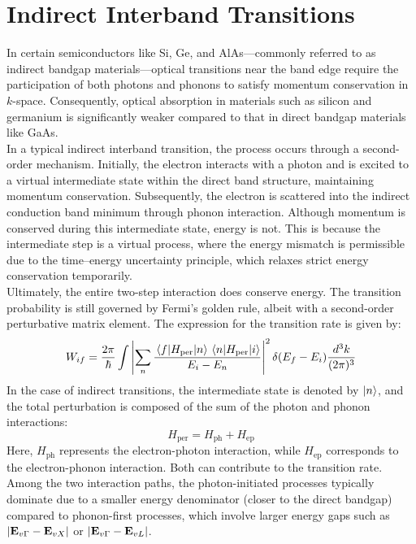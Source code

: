 \section{Indirect Interband Transitions}
In certain semiconductors like Si, Ge, and AlAs—commonly referred to as indirect bandgap materials—optical transitions near the band edge require the participation of both photons and phonons to satisfy momentum conservation in $k$-space. Consequently, optical absorption in materials such as silicon and germanium is significantly weaker compared to that in direct bandgap materials like GaAs.\\
In a typical indirect interband transition, the process occurs through a second-order mechanism. Initially, the electron interacts with a photon and is excited to a virtual intermediate state within the direct band structure, maintaining momentum conservation. Subsequently, the electron is scattered into the indirect conduction band minimum through phonon interaction. Although momentum is conserved during this intermediate state, energy is not. This is because the intermediate step is a virtual process, where the energy mismatch is permissible due to the time–energy uncertainty principle, which relaxes strict energy conservation temporarily.\\
Ultimately, the entire two-step interaction does conserve energy. The transition probability is still governed by Fermi’s golden rule, albeit with a second-order perturbative matrix element. The expression for the transition rate is given by:
\begin{equation}
	W_{if} = \frac{2\pi}{\hbar} \int \left| \sum_n \frac{ \mel{f}{H_{\text{per}}}{n} \mel{n}{H_{\text{per}}}{i} }{E_i - E_n} \right|^2 \delta(E_f - E_i) \frac{d^3k}{(2\pi)^3}
\end{equation}
In the case of indirect transitions, the intermediate state is denoted by \( \ket{n} \), and the total perturbation is composed of the sum of the photon and phonon interactions:
\begin{equation}
	H_{\text{per}} = H_{\text{ph}} + H_{\text{ep}}
\end{equation}
Here, \( H_{\text{ph}} \) represents the electron-photon interaction, while \( H_{\text{ep}} \) corresponds to the electron-phonon interaction. Both can contribute to the transition rate. Among the two interaction paths, the photon-initiated processes typically dominate due to a smaller energy denominator (closer to the direct bandgap) compared to phonon-first processes, which involve larger energy gaps such as \( \abs{\vb{E}_{v\Gamma} - \vb{E}_{vX}} \) or \( \abs{\vb{E}_{v\Gamma} - \vb{E}_{vL}} \).\\
